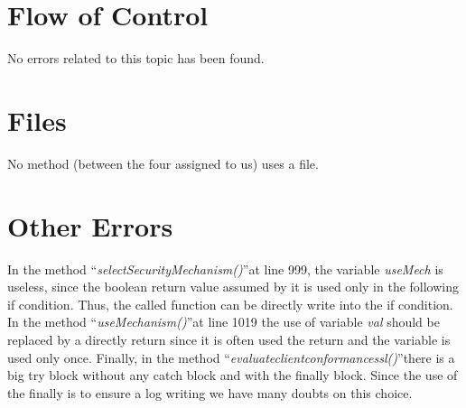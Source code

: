 \documentclass[\mainpath/main]{subfiles}
\begin{document}
\section{Flow of Control}
\label{CodeInspectionChecklist:FlowofControl}
No errors related to this topic has been found.

\section{Files}
\label{CodeInspectionChecklist:Files}
No method (between the four assigned to us) uses a file.

\section{Other Errors}
\label{CodeInspectionChecklist:OtherErrors}
In the method \textquotedblleft \textit{selectSecurityMechanism(\textellipsis)}\textquotedblright at line 999, the variable \textit{useMech} is useless, since the boolean return value assumed by it is used only in the following if condition. Thus, the called function can be directly write into the if condition.
In the method \textquotedblleft \textit{useMechanism(\textellipsis)}\textquotedblright at line 1019 the use of variable \textit{val} should be replaced by a directly return since it is often used the return and the variable is used only once.
Finally, in the method \textquotedblleft \textit{evaluate\textunderscore client\textunderscore conformance\textunderscore ssl(\textellipsis)}\textquotedblright there is a big try block without any catch block and with the finally block. Since the use of the finally is to ensure a log writing we have many doubts on this choice.
\end{document}
